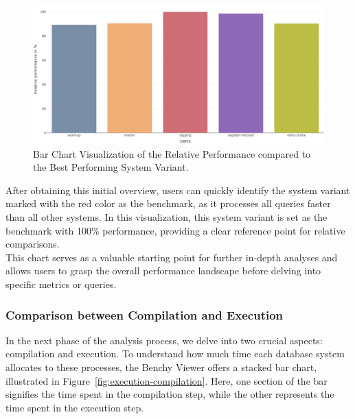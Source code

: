 \begin{figure}[h]
  \centering
  \includegraphics[width=1\linewidth]{figures/bsp-relative-performance.png}
  \caption{Bar Chart Visualization of the Relative Performance compared to the Best Performing System Variant.}
  \label{fig:relative-performance}
\end{figure}

After obtaining this initial overview, users can quickly identify the system variant marked with the red color as the benchmark, as it processes all queries faster than all other systems. In this visualization, this system variant is set as the benchmark with 100\% performance, providing a clear reference point for relative comparisons.\\
This chart serves as a valuable starting point for further in-depth analyses and allows users to grasp the overall performance landscape before delving into specific metrics or queries.


\subsubsection{Comparison between Compilation and Execution}

In the next phase of the analysis process, we delve into two crucial aspects: compilation and execution. To understand how much time each database system allocates to these processes, the Benchy Viewer offers a stacked bar chart, illustrated in Figure~\ref{fig:execution-compilation}. Here, one section of the bar signifies the time spent in the compilation step, while the other represents the time spent in the execution step.

